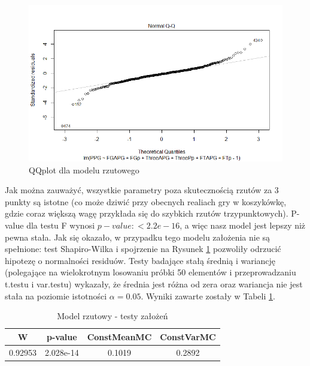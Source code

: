 \documentclass[11pt,a4paper]{article}
\begin{document}
\begin{figure}[t]
\includegraphics[width=\textwidth]{offense_2}
\caption{QQplot dla modelu rzutowego}
\label{qqplot_offense}
\centering
\end{figure}
Jak można zauważyć, wszystkie parametry poza skutecznością rzutów za 3 punkty są istotne (co może dziwić przy obecnych realiach gry w koszykówkę, gdzie coraz większą wagę przykłada się do szybkich rzutów trzypunktowych). P-value dla testu F wynosi $p-value: < 2.2e-16$, a więc nasz model jest lepszy niż pewna stała. Jak się okazało, w przypadku tego modelu założenia nie są spełnione: test Shapiro-Wilka i spojrzenie na Rysunek \ref{qqplot_offense} pozwoliły odrzucić hipotezę o normalności residuów. Testy badające stałą średnią i wariancję (polegające na wielokrotnym losowaniu próbki 50 elementów i przeprowadzaniu t.testu i var.testu) wykazały, że średnia jest różna od zera oraz wariancja nie jest stała na poziomie istotności $\alpha=0.05$. Wyniki zawarte zostały w Tabeli \ref{zalozenia_offense}.
\begin{table}[H]
	\begin{center}
	\begin{tabular}{| c | c | c | c |}
		\hline
		W & p-value & ConstMeanMC & ConstVarMC\\ \hline
		0.92953 & 2.028e-14 & 0.1019 & 0.2892 \\ \hline
	\end{tabular}
	\caption{Model rzutowy - testy założeń}
	\label{zalozenia_offense}
	\end{center}
\end{table}
\end{document}
